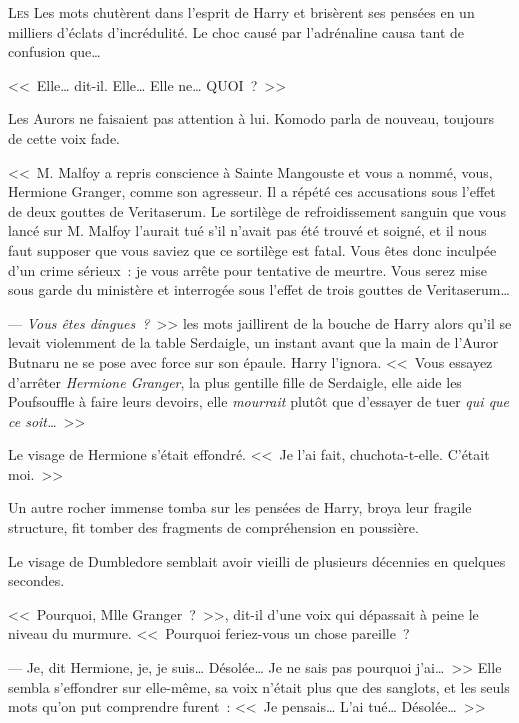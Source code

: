 
\lettrine{L}{es} Les mots chutèrent dans l'esprit de Harry et brisèrent ses pensées en un milliers d'éclats d'incrédulité. Le choc causé par l'adrénaline causa tant de confusion que…

<<~Elle… dit-il. Elle… Elle ne… QUOI~?~>>

Les Aurors ne faisaient pas attention à lui. Komodo parla de nouveau, toujours de cette voix fade.

<<~M. Malfoy a repris conscience à Sainte Mangouste et vous a nommé, vous, Hermione Granger, comme son agresseur. Il a répété ces accusations sous l'effet de deux gouttes de Veritaserum. Le sortilège de refroidissement sanguin que vous lancé sur M. Malfoy l'aurait tué s'il n'avait pas été trouvé et soigné, et il nous faut supposer que vous saviez que ce sortilège est fatal. Vous êtes donc inculpée d'un crime sérieux~: je vous arrête pour tentative de meurtre. Vous serez mise sous garde du ministère et interrogée sous l'effet de trois gouttes de Veritaserum…

--- \emph{Vous êtes dingues~?}~>> les mots jaillirent de la bouche de Harry alors qu'il se levait violemment de la table Serdaigle, un instant avant que la main de l'Auror Butnaru ne se pose avec force sur son épaule. Harry l'ignora. <<~Vous essayez d'arrêter \emph{Hermione Granger}, la plus gentille fille de Serdaigle, elle aide les Poufsouffle à faire leurs devoirs, elle \emph{mourrait} plutôt que d'essayer de tuer \emph{qui que ce soit…}~>>

Le visage de Hermione s'était effondré. <<~Je l'ai fait, chuchota-t-elle. C'était moi.~>>

Un autre rocher immense tomba sur les pensées de Harry, broya leur fragile structure, fit tomber des fragments de compréhension en poussière.

Le visage de Dumbledore semblait avoir vieilli de plusieurs décennies en quelques secondes.

<<~Pourquoi, Mlle Granger~?~>>, dit-il d'une voix qui dépassait à peine le niveau du murmure. <<~Pourquoi feriez-vous un chose pareille~?

--- Je, dit Hermione, je, je suis… Désolée… Je ne sais pas pourquoi j'ai…~>> Elle sembla s'effondrer sur elle-même, sa voix n'était plus que des sanglots, et les seuls mots qu'on put comprendre furent~: <<~Je pensais… L'ai tué… Désolée…~>>

